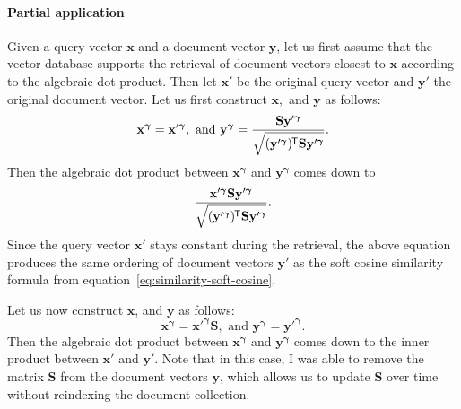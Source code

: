 \documentclass[
  digital, %
  notable, %
  lof,     %
  lot,     %
  nopalatino, color
]{fithesis3}
\newcommand*{\tran}{^{\mkern-1.5mu\mathsf{T}}}
\begin{document}
\paragraph{Partial application} Given a query vector $\mathbf x$ and a
document vector $\mathbf y$, let us first assume that the vector database
supports the retrieval of document vectors closest to $\mathbf x$ according to
the algebraic dot product. Then let $\mathbf x'$ be the original query vector and
$\mathbf y'$ the original document vector. Let us first construct $\mathbf x,$
and $\mathbf y$ as follows:
\begin{equation*}
  \mathbf x^{\bm\gamma} = \mathbf x'^{\bm\gamma},\text{ and }
  \mathbf y^{\bm\gamma} = \frac{\mathbf S\mathbf y'^{\bm\gamma}}{\sqrt{\strut(\mathbf y'^{\bm\gamma})\tran\mathbf S\mathbf y'^{\bm\gamma}}}.
\end{equation*}
Then the algebraic dot product between $\mathbf x^{\bm\gamma}$ and $\mathbf
y^{\bm\gamma}$ comes down to
\begin{equation*}
  \frac{\mathbf x'^{\bm\gamma}\mathbf S\mathbf y'^{\bm\gamma}}{\sqrt{\strut(\mathbf y'^{\bm\gamma})\tran\mathbf S\mathbf y'^{\bm\gamma}}}.
\end{equation*}
Since the query vector $\mathbf x'$ stays constant during the retrieval, the above
equation produces the same ordering of document vectors $\mathbf y'$ as the soft
cosine similarity formula from equation~\ref{eq:similarity-soft-cosine}.

Let us now construct $\mathbf x$, and $\mathbf y$ as follows:
\begin{equation*}
  \mathbf x^{\bm\gamma} = \mathbf x'^{\bm\gamma}\mathbf S,\text{ and }
  \mathbf y^{\bm\gamma} = \mathbf y'^{\bm\gamma}.
\end{equation*}
Then the algebraic dot product between $\mathbf x^{\bm\gamma}$ and $\mathbf
y^{\bm\gamma}$ comes down to the inner product between $\mathbf x'$ and
$\mathbf y'$. Note that in this case, I was able to remove the matrix
$\mathbf S$ from the document vectors $\mathbf y$, which allows us to update
$\mathbf S$ over time without reindexing the document
collection.
\end{document}
